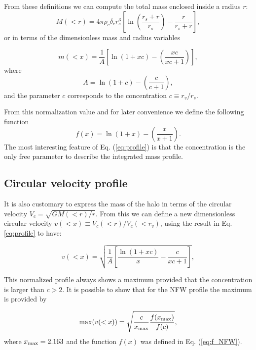 \documentclass[a4,useAMS,usenatbib,usegraphicx]{mn2e}
\begin{document}
From these definitions we can compute the total mass enclosed inside a
radius $r$:
\begin{equation}
M(<r) = 4\pi\rho_c\delta_c  r_s^3\left[\ln \left
  (\frac{r_s+r}{r_s}\right) - \frac{r}{r_s+r}\right],
\end{equation}
%
or in terms of the dimensionless mass and radius variables

\begin{equation}
m(<x) =
\frac{1}{A}\left[\ln\left(1+xc\right)-\left(\frac{xc}{xc+1}\right)\right],
\label{eq:profile}
\end{equation}
%
where
%
\begin{equation}
A=\ln\left(1+c\right)-\left(\frac{c}{c+1}\right),
\end{equation}
%
and the parameter $c$ corresponds to the concentration $c\equiv r_v/r_s$.

From this normalization value and for later convenience we define the
following function
%
\begin{equation}
f(x) = \ln\left(1+x\right)-\left(\frac{x}{x+1}\right).
\label{eq:f_NFW}
\end{equation}
%
The most interesting feature of Eq. (\ref{eq:profile}) is that the
concentration is the only free parameter to describe the integrated
mass profile.
 
\subsection{Circular velocity profile}

It is also customary to express the mass of the halo in terms of the
circular velocity $V_{c}=\sqrt{GM(<r)/r}$.
From this we can define a new dimensionless circular velocity $v(<x)\equiv
V_{c}(<r)/V_{c}(<r_v)$, using the result in Eq. \ref{eq:profile}
to have:

\begin{equation}
v(<x)=\sqrt{\frac{1}{A}\left[\frac{\ln\left(1+xc\right)}{x}-\frac{c}{xc+1}\right]},
\end{equation}


This normalized profile always shows a maximum provided that the
concentration is larger than $c>2$.
It is possible to show that for the NFW profile the maximum is
provided by

\begin{equation}
\mathrm{max}(v(<x)) = \sqrt{\frac{c}{x_{\rm max}}\frac{f(x_{\rm
      max})}{f(c)}},
\label{eq:max_v}
\end{equation}
where $x_{\rm max}=2.163$ \citep{Klypin2014} and the function $f(x)$
was defined in Eq. (\ref{eq:f_NFW}).
\end{document}
